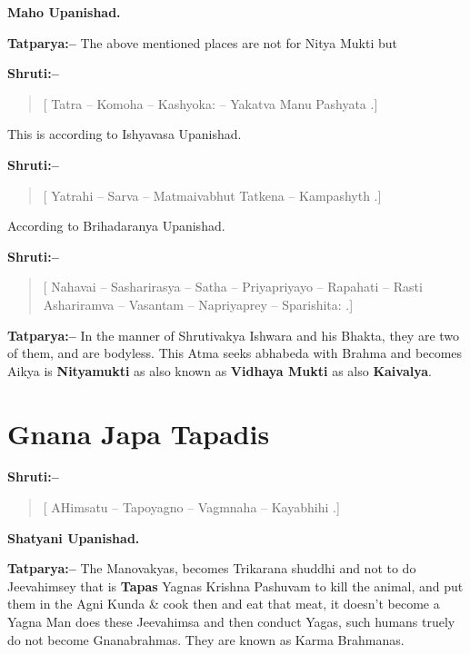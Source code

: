 \begin{flushright}
\textbf{Maho Upanishad.}
\end{flushright}

\textbf{Tatparya:–} The above mentioned places are not for Nitya Mukti but

\textbf{Shruti:–}

\begin{verse}
[ Tatra – Komoha – Kashyoka: – Yakatva Manu Pashyata .]
\end{verse}

This is according to Ishyavasa Upanishad.

\textbf{Shruti:–}

\begin{verse}
[ Yatrahi – Sarva – Matmaivabhut  Tatkena – Kampashyth .]
\end{verse}

According to Brihadaranya Upanishad.

\textbf{Shruti:–}

\begin{verse}
[ Nahavai – Sasharirasya – Satha – Priyapriyayo – Rapahati – Rasti  Ashariramva – Vasantam – Napriyaprey – Sparishita: .]
\end{verse}

\textbf{Tatparya:–} In the manner of Shrutivakya Ishwara and his Bhakta, they are two of them, and are bodyless. This Atma seeks abhabeda with Brahma and becomes Aikya is \textbf{Nityamukti} as also known as \textbf{Vidhaya Mukti} as also \textbf{Kaivalya}.

\chapter{Gnana Japa Tapadis}

\textbf{Shruti:–}

\begin{verse}
[ AHimsatu – Tapoyagno – Vagmnaha – Kayabhihi .]
\end{verse}

\begin{flushright}
\textbf{Shatyani Upanishad.}
\end{flushright}

\textbf{Tatparya:–} The Manovakyas, becomes Trikarana shuddhi and not to do Jeevahimsey that is \textbf{Tapas} Yagnas Krishna Pashuvam to kill the animal, and put them in the Agni Kunda \& cook then and eat that meat, it doesn't become a Yagna Man does these Jeevahimsa and then conduct Yagas, such humans truely do not become Gnanabrahmas. They are known as Karma Brahmanas.

